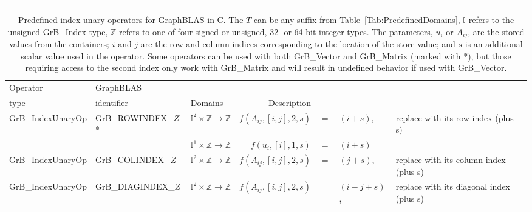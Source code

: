 \begin{landscape}

\begin{table*}
\hspace{-2.5em}\begin{threeparttable}
\hrule
\vspace{1\baselineskip}
\caption{ Predefined index unary operators for GraphBLAS in C.  The $T$ can 
be any suffix from Table~\ref{Tab:PredefinedDomains}, $\mathbb{I}$ refers to the unsigned 
{\sf GrB\_Index} type, $\mathbb{Z}$ refers to one of four signed or unsigned, 32- or 64-bit integer types.  
The parameters, $u_i$ or $A_{ij}$, are the stored values from the containers; $i$ 
and $j$ are the row and column indices corresponding to the location of the store value;
and $s$ is an additional scalar value used in the operator. Some operators can be used with both
{\sf GrB\_Vector} and {\sf GrB\_Matrix} (marked with *), but those requiring access to the second index
only work with {\sf GrB\_Matrix} and will result in undefined behavior if used with
{\sf GrB\_Vector}. }
\label{Tab:PredefIndexOperators}
\vspace{1\baselineskip}

\begin{tabular}{l|l|l|rcll}
Operator & GraphBLAS             &                                                      & \\
type     & identifier            & Domains                                              & Description \\ \hline
{\sf GrB\_IndexUnaryOp}   & {\sf GrB\_ROWINDEX\_$Z$}*  & $\mathbb{I}^2 \times \mathbb{Z} \rightarrow \mathbb{Z}$ & $f(A_{ij},[i,j],2,s)$ & $=$ & $(i + s)$, & replace with its row index (plus s) \\
                          &                            & $\mathbb{I}^1 \times \mathbb{Z} \rightarrow \mathbb{Z}$ & $f(u_{i},[i],1,s)$ & $=$ & $(i + s)$ \\
{\sf GrB\_IndexUnaryOp}   & {\sf GrB\_COLINDEX\_$Z$}   & $\mathbb{I}^2 \times \mathbb{Z} \rightarrow \mathbb{Z}$ & $f(A_{ij},[i,j],2,s)$ & $=$ & $(j + s)$, & replace with its column index (plus s) \\
{\sf GrB\_IndexUnaryOp}   & {\sf GrB\_DIAGINDEX\_$Z$}  & $\mathbb{I}^2 \times \mathbb{Z} \rightarrow \mathbb{Z}$ & $f(A_{ij},[i,j],2,s)$ & $=$ & $(i - j + s)$, & replace with its diagonal index (plus s) \\
\hline


\end{tabular}
\end{threeparttable}
\end{table*}
\end{landscape}

